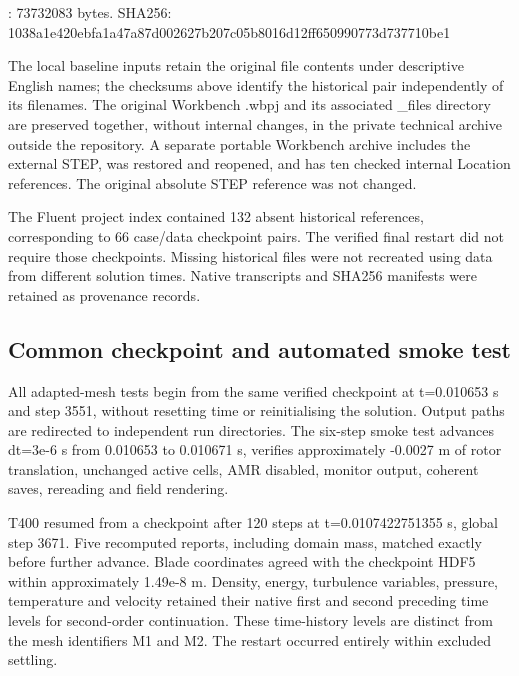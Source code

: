 \documentclass[11pt,a4paper]{article}
\begin{document}
: 73732083 bytes. SHA256: {\ttfamily\small 1038a1e4\allowbreak{}20ebfa1a\allowbreak{}47a87d00\allowbreak{}2627b207\allowbreak{}c05b8016\allowbreak{}d12ff650\allowbreak{}990773d7\allowbreak{}37710be1}\par

The local baseline inputs retain the original file contents under descriptive English names; the checksums above identify the historical pair independently of its filenames. The original Workbench .wbpj and its associated \_files directory are preserved together, without internal changes, in the private technical archive outside the repository. A separate portable Workbench archive includes the external STEP, was restored and reopened, and has ten checked internal Location references. The original absolute STEP reference was not changed.\par

The Fluent project index contained 132 absent historical references, corresponding to 66 case/data checkpoint pairs. The verified final restart did not require those checkpoints. Missing historical files were not recreated using data from different solution times. Native transcripts and SHA256 manifests were retained as provenance records.\par

\subsection{Common checkpoint and automated smoke test}
All adapted-mesh tests begin from the same verified checkpoint at t=0.010653 s and step 3551, without resetting time or reinitialising the solution. Output paths are redirected to independent run directories. The six-step smoke test advances dt=3e-6 s from 0.010653 to 0.010671 s, verifies approximately -0.0027 m of rotor translation, unchanged active cells, AMR disabled, monitor output, coherent saves, rereading and field rendering.\par

T400 resumed from a checkpoint after 120 steps at t=0.0107422751355 s, global step 3671. Five recomputed reports, including domain mass, matched exactly before further advance. Blade coordinates agreed with the checkpoint HDF5 within approximately 1.49e-8 m. Density, energy, turbulence variables, pressure, temperature and velocity retained their native first and second preceding time levels for second-order continuation. These time-history levels are distinct from the mesh identifiers M1 and M2. The restart occurred entirely within excluded settling.\par
\end{document}

